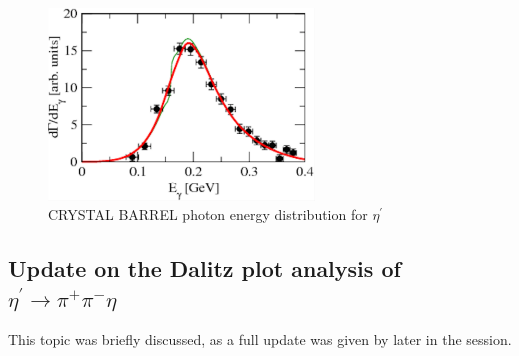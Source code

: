 \documentclass{aip-cp}
\begin{document}
\begin{figure}[h!]
	\centerline{\includegraphics[width=200pt]{figures/CRYSTAL_etaP.pdf}}
	\caption{CRYSTAL BARREL photon energy distribution for  $\eta^{\prime}$~\cite{bib3}}
	\label{fig:crystal_etaP}
\end{figure}
\subsection{Update on the Dalitz plot analysis of $\eta^{\prime} \to \pi^+ \pi^- \eta$}
% 
This topic was briefly discussed, as a full update was given by later in the session.
\end{document}
